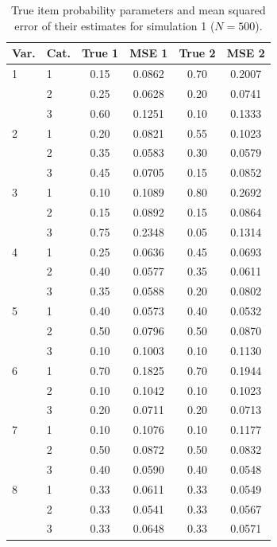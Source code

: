 \begin{table}[H]
\centering
\begin{tabular}{llcccc}
  \toprule
\textbf{Var.} & \textbf{Cat.} & \textbf{True 1} & \textbf{MSE 1} & \textbf{True 2} & \textbf{MSE 2} \\ 
  \midrule
1 & 1 & 0.15 & 0.0862 & 0.70 & 0.2007 \\ 
   & 2 & 0.25 & 0.0628 & 0.20 & 0.0741 \\ 
   & 3 & 0.60 & 0.1251 & 0.10 & 0.1333 \\ 
  2 & 1 & 0.20 & 0.0821 & 0.55 & 0.1023 \\ 
   & 2 & 0.35 & 0.0583 & 0.30 & 0.0579 \\ 
   & 3 & 0.45 & 0.0705 & 0.15 & 0.0852 \\ 
  3 & 1 & 0.10 & 0.1089 & 0.80 & 0.2692 \\ 
   & 2 & 0.15 & 0.0892 & 0.15 & 0.0864 \\ 
   & 3 & 0.75 & 0.2348 & 0.05 & 0.1314 \\ 
  4 & 1 & 0.25 & 0.0636 & 0.45 & 0.0693 \\ 
   & 2 & 0.40 & 0.0577 & 0.35 & 0.0611 \\ 
   & 3 & 0.35 & 0.0588 & 0.20 & 0.0802 \\ 
  5 & 1 & 0.40 & 0.0573 & 0.40 & 0.0532 \\ 
   & 2 & 0.50 & 0.0796 & 0.50 & 0.0870 \\ 
   & 3 & 0.10 & 0.1003 & 0.10 & 0.1130 \\ 
  6 & 1 & 0.70 & 0.1825 & 0.70 & 0.1944 \\ 
   & 2 & 0.10 & 0.1042 & 0.10 & 0.1023 \\ 
   & 3 & 0.20 & 0.0711 & 0.20 & 0.0713 \\ 
  7 & 1 & 0.10 & 0.1076 & 0.10 & 0.1177 \\ 
   & 2 & 0.50 & 0.0872 & 0.50 & 0.0832 \\ 
   & 3 & 0.40 & 0.0590 & 0.40 & 0.0548 \\ 
  8 & 1 & 0.33 & 0.0611 & 0.33 & 0.0549 \\ 
   & 2 & 0.33 & 0.0541 & 0.33 & 0.0567 \\ 
   & 3 & 0.33 & 0.0648 & 0.33 & 0.0571 \\ 
   \bottomrule
\end{tabular}
\caption{True item probability parameters and mean squared error of their estimates for simulation 1 ($N = 500$).} 
\label{table:sim1_item_prob_mse_N500}
\end{table}
